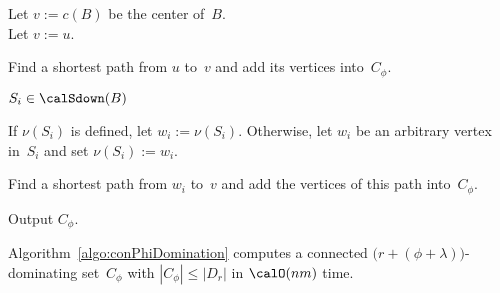 \begin{algorithm}
{    \parbox[t]{\hsize}
    {%
        \rHrt Let $v := c(B)$ be the center of~$B$. \\
        \rDmd Let $v := u$.
    }
    \label{line:defineV}

    Find a shortest path from $u$ to~$v$ and add its vertices into~$C_\phi$.

    \ForEach
    {%
        \( S_i \in \calSdown(B) \)
    }
    {%
        If $\nu(S_i)$ is defined, let $w_i := \nu(S_i)$.
        Otherwise, let $w_i$ be an arbitrary vertex in~$S_i$ and set $\nu(S_i) := w_i$.

        Find a shortest path from $w_i$ to~$v$ and add the vertices of this path into~$C_\phi$.
        \label{line:conBagSepar}
    }
}

Output $C_\phi$.
\end{algorithm}

\begin{theorem}
Algorithm~\ref{algo:conPhiDomination} computes a connected \( \big( r + (\phi + \lambda) \big) \)-dominating set~\( C_\phi \) with \( |C_\phi| \leq |D_r| \) in \( \calO(nm) \) time.
\end{theorem}

